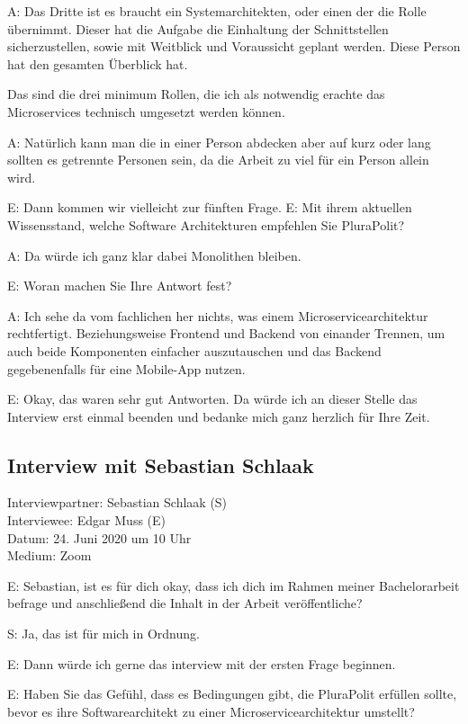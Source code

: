 A:  Das Dritte ist es braucht ein Systemarchitekten, oder einen der die Rolle übernimmt. Dieser hat die Aufgabe die Einhaltung der Schnittstellen sicherzustellen, sowie mit Weitblick und Voraussicht geplant werden. Diese Person hat den gesamten Überblick hat.

 Das sind die drei minimum Rollen, die ich als notwendig erachte das Microservices technisch umgesetzt werden können. 

A: Natürlich kann man die in einer Person abdecken aber auf kurz oder lang sollten es getrennte Personen sein, da die Arbeit zu viel für ein Person allein wird. 

E: Dann kommen wir vielleicht zur fünften Frage.
E: Mit ihrem aktuellen Wissensstand, welche Software Architekturen empfehlen Sie PluraPolit? 

A: Da würde ich ganz klar dabei Monolithen bleiben.

E: Woran machen Sie Ihre Antwort fest?

A: Ich sehe da vom fachlichen her nichts, was einem Microservicearchitektur rechtfertigt.
Beziehungsweise Frontend und Backend von einander Trennen, um auch beide Komponenten einfacher auszutauschen und das Backend gegebenenfalls für eine Mobile-App nutzen.

E: Okay, das waren sehr gut Antworten. Da würde ich an dieser Stelle das Interview erst einmal beenden und bedanke mich ganz herzlich für Ihre Zeit.

\subsection{Interview mit Sebastian Schlaak}

Interviewpartner: Sebastian Schlaak (S) \\
Interviewee: Edgar Muss (E) \\
Datum: 24. Juni 2020 um 10 Uhr \\
Medium: Zoom

E: Sebastian, ist es für dich okay, dass ich dich im Rahmen meiner Bachelorarbeit befrage und anschließend die Inhalt in der Arbeit veröffentliche?

S: Ja, das ist für mich in Ordnung.

E: Dann würde ich gerne das interview mit der ersten Frage beginnen. 

E: Haben Sie das Gefühl, dass es Bedingungen gibt, die PluraPolit erfüllen sollte, bevor es ihre Softwarearchitekt zu einer Microservicearchitektur umstellt?


